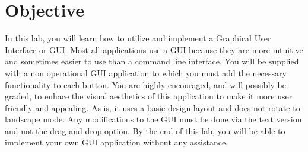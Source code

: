 \section{Objective}

In this lab, you will learn how to utilize and implement a Graphical User Interface or GUI. Most all applications use a GUI because they are more intuitive and sometimes easier to use than a command line interface. You will be supplied with a non operational GUI application to which you must add the necessary functionality to each button. You are highly encouraged, and will possibly be graded, to enhace the visual aesthetics of this application to make it more user friendly and appealing. As is, it uses a basic design layout and does not rotate to landscape mode. Any modifications to the GUI must be done via the text version and not the drag and drop option. By the end of this lab, you will be able to implement your own GUI application without any assistance.